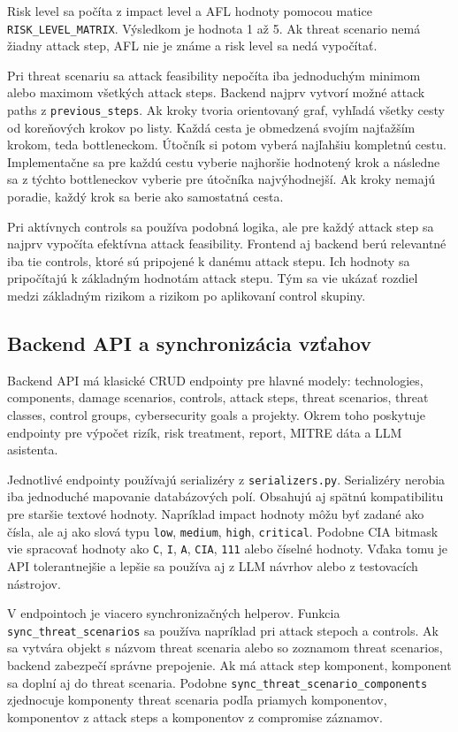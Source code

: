 \documentclass[11pt]{article}
\begin{document}
Risk level sa počíta z impact level a AFL hodnoty pomocou matice \texttt{RISK\_LEVEL\_MATRIX}. Výsledkom je hodnota 1 až 5. Ak threat scenario nemá žiadny attack step, AFL nie je známe a risk level sa nedá vypočítať.

Pri threat scenariu sa attack feasibility nepočíta iba jednoduchým minimom alebo maximom všetkých attack steps. Backend najprv vytvorí možné attack paths z \texttt{previous\_steps}. Ak kroky tvoria orientovaný graf, vyhľadá všetky cesty od koreňových krokov po listy. Každá cesta je obmedzená svojím najťažším krokom, teda bottleneckom. Útočník si potom vyberá najľahšiu kompletnú cestu. Implementačne sa pre každú cestu vyberie najhoršie hodnotený krok a následne sa z týchto bottleneckov vyberie pre útočníka najvýhodnejší. Ak kroky nemajú poradie, každý krok sa berie ako samostatná cesta.

Pri aktívnych controls sa používa podobná logika, ale pre každý attack step sa najprv vypočíta efektívna attack feasibility. Frontend aj backend berú relevantné iba tie controls, ktoré sú pripojené k danému attack stepu. Ich hodnoty sa pripočítajú k základným hodnotám attack stepu. Tým sa vie ukázať rozdiel medzi základným rizikom a rizikom po aplikovaní control skupiny.

\subsection{Backend API a synchronizácia vzťahov}

Backend API má klasické CRUD endpointy pre hlavné modely: technologies, components, damage scenarios, controls, attack steps, threat scenarios, threat classes, control groups, cybersecurity goals a projekty. Okrem toho poskytuje endpointy pre výpočet rizík, risk treatment, report, MITRE dáta a LLM asistenta.

Jednotlivé endpointy používajú serializéry z \texttt{serializers.py}. Serializéry nerobia iba jednoduché mapovanie databázových polí. Obsahujú aj spätnú kompatibilitu pre staršie textové hodnoty. Napríklad impact hodnoty môžu byť zadané ako čísla, ale aj ako slová typu \texttt{low}, \texttt{medium}, \texttt{high}, \texttt{critical}. Podobne CIA bitmask vie spracovať hodnoty ako \texttt{C}, \texttt{I}, \texttt{A}, \texttt{CIA}, \texttt{111} alebo číselné hodnoty. Vďaka tomu je API tolerantnejšie a lepšie sa používa aj z LLM návrhov alebo z testovacích nástrojov.

V endpointoch je viacero synchronizačných helperov. Funkcia \texttt{sync\_threat\_scenarios} sa používa napríklad pri attack stepoch a controls. Ak sa vytvára objekt s názvom threat scenaria alebo so zoznamom threat scenarios, backend zabezpečí správne prepojenie. Ak má attack step komponent, komponent sa doplní aj do threat scenaria. Podobne \texttt{sync\_threat\_scenario\_components} zjednocuje komponenty threat scenaria podľa priamych komponentov, komponentov z attack steps a komponentov z compromise záznamov.
\end{document}
